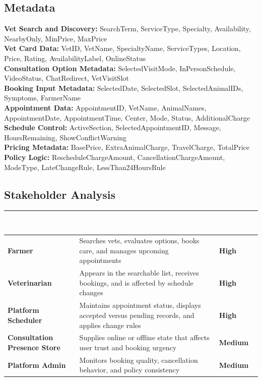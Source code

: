 \documentclass[12pt]{article}
\begin{document}
\subsection{Metadata}
\textbf{Vet Search and Discovery:} SearchTerm, ServiceType, Specialty, Availability, NearbyOnly, MinPrice, MaxPrice\\
\textbf{Vet Card Data:} VetID, VetName, SpecialtyName, ServiceTypes, Location, Price, Rating, AvailabilityLabel, OnlineStatus\\
\textbf{Consultation Option Metadata:} SelectedVisitMode, InPersonSchedule, VideoStatus, ChatRedirect, VetVisitSlot\\
\textbf{Booking Input Metadata:} SelectedDate, SelectedSlot, SelectedAnimalIDs, Symptoms, FarmerName\\
\textbf{Appointment Data:} AppointmentID, VetName, AnimalNames, AppointmentDate, AppointmentTime, Center, Mode, Status, AdditionalCharge\\
\textbf{Schedule Control:} ActiveSection, SelectedAppointmentID, Message, HoursRemaining, ShowConflictWarning\\
\textbf{Pricing Metadata:} BasePrice, ExtraAnimalCharge, TravelCharge, TotalPrice\\
\textbf{Policy Logic:} RescheduleChargeAmount, CancellationChargeAmount, ModeType, LateChangeRule, LessThan24HoursRule

\subsection{Stakeholder Analysis}

\begin{longtable}{|p{3cm}|p{6cm}|p{3cm}|}
\hline
\rowcolor{headerblue}\textcolor{white}{\textbf{Stakeholder}} & \textcolor{white}{\textbf{Role / Interest}} & \textcolor{white}{\textbf{Impact Level}} \\
\hline
\textbf{Farmer} & Searches vets, evaluates options, books care, and manages upcoming appointments & \textbf{High} \\
\hline
\rowcolor{rowgray}
\textbf{Veterinarian} & Appears in the searchable list, receives bookings, and is affected by schedule changes & \textbf{High} \\
\hline
\textbf{Platform Scheduler} & Maintains appointment status, displays accepted versus pending records, and applies change rules & \textbf{High} \\
\hline
\rowcolor{rowgray}
\textbf{Consultation Presence Store} & Supplies online or offline state that affects user trust and booking urgency & \textbf{Medium} \\
\hline
\textbf{Platform Admin} & Monitors booking quality, cancellation behavior, and policy consistency & \textbf{Medium} \\
\hline
\end{longtable}
\end{document}
